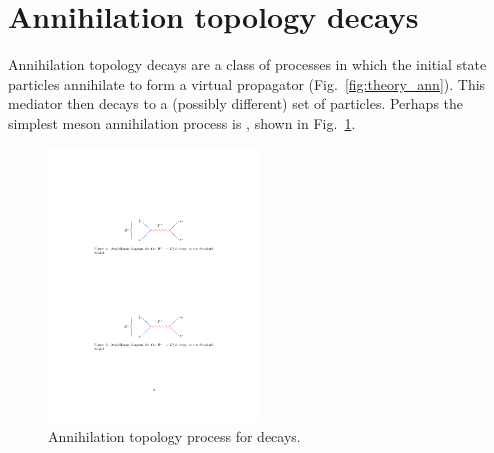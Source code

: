 

\section{Annihilation topology decays}

Annihilation topology decays are a class of processes in which the initial state particles annihilate to form a virtual propagator (Fig.~\ref{fig:theory_ann}). This mediator then decays to a (possibly different) set of particles.
Perhaps the simplest \Bp meson annihilation process is \decay{\Bp}{\ellp\neul}, shown in Fig.~\ref{fig:Theory_B2ellnu}. 
\begin{figure}[!h]
    \centering
        \centering
        \includegraphics[width=0.5\textwidth]{figs/Theory/B2ellnu.pdf}
    \caption{Annihilation topology process for \decay{\Bp}{\ellp\neul} decays.}
    \label{fig:Theory_B2ellnu}   
\end{figure}

